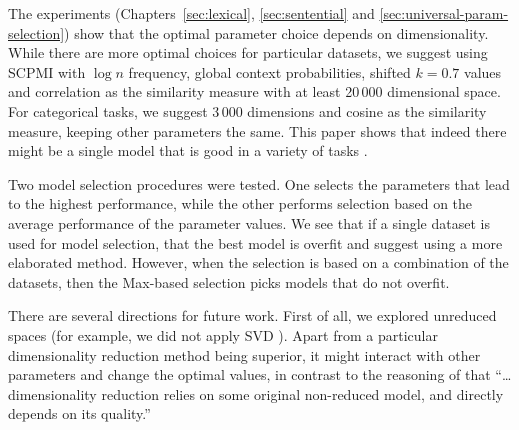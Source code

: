 \documentclass[11pt,a4paper,english,oneside]{book}
\newcommand\newcite\citet
\renewcommand\cite\citep
\begin{document}
The experiments (Chapters~\ref{sec:lexical}, \ref{sec:sentential} and \ref{sec:universal-param-selection}) show that the optimal parameter choice depends on dimensionality. While there are more optimal choices for particular datasets, we suggest using SCPMI with $\log n$ frequency, global context probabilities, shifted $k=0.7$ values and correlation as the similarity measure with at least 20\,000 dimensional space. For categorical tasks, we suggest 3\,000 dimensions and cosine as the similarity measure, keeping other parameters the same. This paper shows that indeed there might be a single model that is good in a variety of tasks \cite{doi:10.1080/02643294.2016.1176907}.
%
%
%

Two model selection procedures were tested. One selects the parameters that lead to the highest performance, while the other performs selection based on the average performance of the parameter values. We see that if a single dataset is used for model selection, that the best model is overfit and suggest using a more elaborated method. However, when the selection is based on a combination of the datasets, then the Max-based selection picks models that do not overfit.

There are several directions for future work. First of all, we explored unreduced spaces (for example, we did not apply SVD \newcite{BullinariaLevy2012}). Apart from a particular dimensionality reduction method being superior, it might interact with other parameters \cite{lapesa2014large} and change the optimal values, in contrast to the reasoning of \newcite{kiela-clark:2014:CVSC} that ``\ldots dimensionality reduction relies on some original non-reduced model, and directly depends on its quality.''
\end{document}
